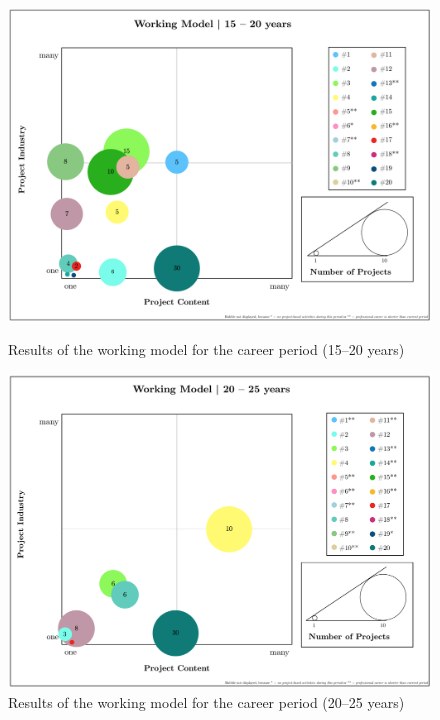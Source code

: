 \begin{figure}[!hbt]
  \includegraphics[width=\linewidth]{figures/WM_1520.png}
  \caption[Results of the working model: 15–20 years]{Results of the working model for the  career period (15–20 years)}
  \label{fig:WM_1520}
\endminipage\hfill
{}
  \includegraphics[width=\linewidth]{figures/WM_2025.png}
  \caption[Results of the working model: 20–25 years]{Results of the working model for the  career period (20–25 years)}
  \label{fig:WM_2025}
  \endminipage
\end{figure}




